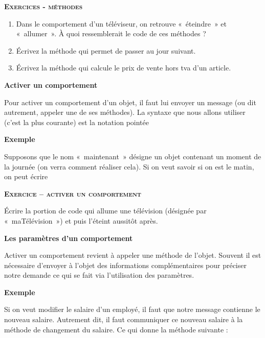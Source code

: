 {\sffamily\bfseries\scshape
Exercices - méthodes}

\begin{enumerate}
	\item 
		Dans le comportement d'un téléviseur, on retrouve
		«~éteindre~» et «~allumer~». À quoi ressemblerait le code de ces
		méthodes ?
	\item 
		Écrivez la méthode qui permet de passer au jour suivant.
	\item 
		Écrivez la méthode qui calcule le prix de vente hors tva d'un article.
\end{enumerate}

\bigskip

{\sffamily\bfseries
Activer un comportement}

{
Pour activer un comportement d'un objet, il faut lui
envoyer un message (ou dit autrement, appeler une de ses méthodes). La
syntaxe que nous allons utiliser (c'est la plus
courante) est la notation pointée}


{\bfseries
Exemple}

{
Supposons que le nom «~maintenant~» désigne un objet contenant un moment
de la journée (on verra comment réaliser cela). Si on veut savoir si on
est le matin, on peut écrire}



\bigskip

{\sffamily\bfseries\scshape
Exercice – activer un comportement}

Écrire la portion de code qui allume une télévision (désignée par
«~maTélévision~») et puis l'éteint aussitôt après.


\bigskip

{\sffamily\bfseries\upshape
Les paramètres d'un comportement}

{
Activer un comportement revient à appeler une méthode de
l'objet. Souvent il est nécessaire
d'envoyer à l'objet des informations
complémentaires pour préciser notre demande ce qui se fait via
l'utilisation des paramètres.}

{\bfseries
Exemple}

Si on veut modifier le salaire d'un employé, il faut
que notre message contienne le nouveau salaire. Autrement dit, il faut
communiquer ce nouveau salaire à la méthode de changement du salaire.
Ce qui donne la méthode suivante :

